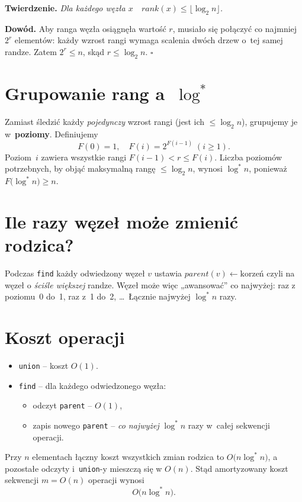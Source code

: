 \documentclass[11pt,a4paper]{article}
\begin{document}
\textbf{Twierdzenie.}
\emph{Dla każdego węzła $x$~~$rank(x)\le\lfloor\log_2 n\rfloor$.}

\smallskip
\textbf{Dowód.}
Aby ranga węzła osiągnęła wartość $r$,
musiało się połączyć co najmniej $2^{r}$ elementów:
każdy wzrost rangi wymaga scalenia
dwóch drzew o~tej samej randze.  
Zatem $2^{r}\le n$, skąd $r\le\log_2 n$.
\hfill$\square$

\section*{Grupowanie rang a~$\log^{\!*}$}

Zamiast śledzić każdy \emph{pojedynczy} wzrost rangi (jest ich
$\le\log_2 n$), grupujemy je w~\textbf{poziomy}.
Definiujemy
\[
F(0)=1,\quad F(i)=2^{F(i-1)}\;(i\ge1).
\]
Poziom~$i$ zawiera wszystkie rangi
\(
F(i-1) < r \le F(i).
\)
Liczba poziomów potrzebnych,
by objąć maksymalną rangę $\le\log_2 n$,
wynosi $\log^{\!*}\!n$, ponieważ $F\bigl(\log^{\!*}\!n\bigr)\ge n$.

\section*{Ile razy węzeł może zmienić rodzica?}

Podczas \texttt{find} każdy odwiedzony węzeł $v$ ustawia
\(
 parent(v)\leftarrow\text{korzeń}
\)
czyli na węzeł o \emph{ściśle większej} randze.
Węzeł może więc „awansować” co najwyżej:
raz z poziomu~0 do~1, raz z~1 do~2, \dots\
Łącznie najwyżej $\log^{\!*}\!n$ razy.

\section*{Koszt operacji}

\begin{itemize}
  \item \texttt{union} -- koszt $O(1)$.
  \item \texttt{find} -- dla każdego odwiedzonego węzła:
        \begin{itemize}
           \item odczyt \texttt{parent} -- $O(1)$,
           \item zapis nowego \texttt{parent} --
                 \emph{co najwyżej} $\log^{\!*}\!n$ razy w~całej
                 sekwencji operacji.
        \end{itemize}
\end{itemize}

Przy $n$ elementach łączny koszt wszystkich zmian rodzica to
$O\!\bigl(n\log^{\!*}\!n\bigr)$,
a pozostałe odczyty i~\texttt{union}-y mieszczą się w $O(n)$.
Stąd amortyzowany koszt sekwencji $m=O(n)$ operacji wynosi
\[
  O\!\bigl(n\log^{\!*}\!n\bigr).
\]
\end{document}
